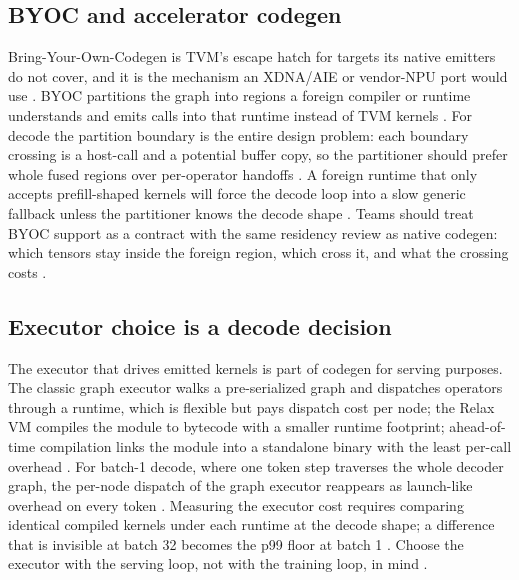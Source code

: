 \subsection{BYOC and accelerator codegen}

Bring-Your-Own-Codegen is TVM's escape hatch for targets its native emitters do not cover, and it is the mechanism an XDNA/AIE or vendor-NPU port would use \citep{chen2018tvm,amd2024xdna}. BYOC partitions the graph into regions a foreign compiler or runtime understands and emits calls into that runtime instead of TVM kernels \citep{chen2018tvm,chen2020compilerbasedhardw}. For decode the partition boundary is the entire design problem: each boundary crossing is a host-call and a potential buffer copy, so the partitioner should prefer whole fused regions over per-operator handoffs \citep{patel2025llminference,memoryfloor2026}. A foreign runtime that only accepts prefill-shaped kernels will force the decode loop into a slow generic fallback unless the partitioner knows the decode shape \citep{amd2024xdna,taxbreak2026}. Teams should treat BYOC support as a contract with the same residency review as native codegen: which tensors stay inside the foreign region, which cross it, and what the crossing costs \citep{yirage2026,chen2020compilerbasedhardw}.

\subsection{Executor choice is a decode decision}

The executor that drives emitted kernels is part of codegen for serving purposes. The classic graph executor walks a pre-serialized graph and dispatches operators through a runtime, which is flexible but pays dispatch cost per node; the Relax VM compiles the module to bytecode with a smaller runtime footprint; ahead-of-time compilation links the module into a standalone binary with the least per-call overhead \citep{chen2018tvm,lai2023relax}. For batch-1 decode, where one token step traverses the whole decoder graph, the per-node dispatch of the graph executor reappears as launch-like overhead on every token \citep{taxbreak2026,kwon2023vllm}. Measuring the executor cost requires comparing identical compiled kernels under each runtime at the decode shape; a difference that is invisible at batch 32 becomes the p99 floor at batch 1 \citep{patel2025llminference,memoryfloor2026}. Choose the executor with the serving loop, not with the training loop, in mind \citep{chen2018tvm,taxbreak2026}.

